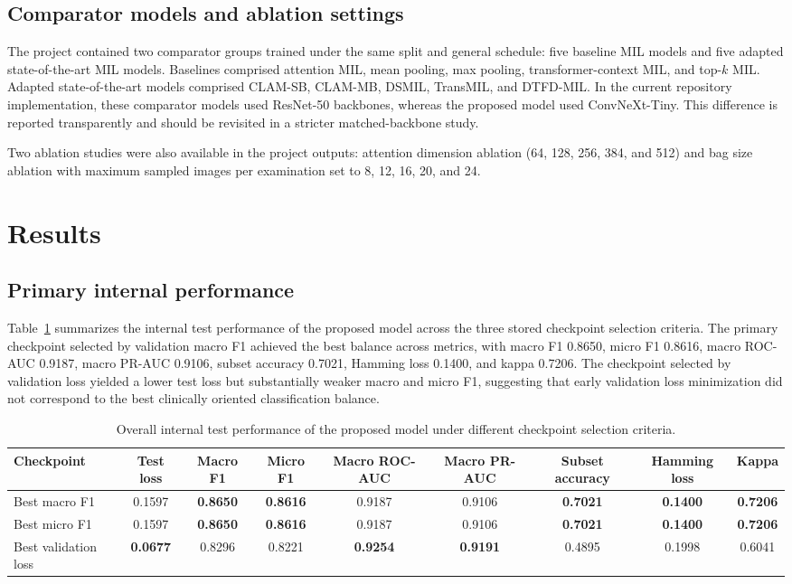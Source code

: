 \documentclass[Afour,sagev,times]{sagej}
\begin{document}
\subsection{Comparator models and ablation settings}
The project contained two comparator groups trained under the same split and general schedule: five baseline MIL models and five adapted state-of-the-art MIL models. Baselines comprised attention MIL, mean pooling, max pooling, transformer-context MIL, and top-$k$ MIL. Adapted state-of-the-art models comprised CLAM-SB, CLAM-MB, DSMIL, TransMIL, and DTFD-MIL.\cite{R5,R6,R7,R8} In the current repository implementation, these comparator models used ResNet-50 backbones, whereas the proposed model used ConvNeXt-Tiny. This difference is reported transparently and should be revisited in a stricter matched-backbone study.

Two ablation studies were also available in the project outputs: attention dimension ablation (64, 128, 256, 384, and 512) and bag size ablation with maximum sampled images per examination set to 8, 12, 16, 20, and 24.

\section{Results}
\subsection{Primary internal performance}
Table~\ref{T2} summarizes the internal test performance of the proposed model across the three stored checkpoint selection criteria. The primary checkpoint selected by validation macro F1 achieved the best balance across metrics, with macro F1 0.8650, micro F1 0.8616, macro ROC-AUC 0.9187, macro PR-AUC 0.9106, subset accuracy 0.7021, Hamming loss 0.1400, and kappa 0.7206. The checkpoint selected by validation loss yielded a lower test loss but substantially weaker macro and micro F1, suggesting that early validation loss minimization did not correspond to the best clinically oriented classification balance.

\begin{table}[h]
\small\sf\centering
\caption{Overall internal test performance of the proposed model under different checkpoint selection criteria.\label{T2}}
\begin{tabular}{lcccccccc}
\toprule
Checkpoint & Test loss & Macro F1 & Micro F1 & Macro ROC-AUC & Macro PR-AUC & Subset accuracy & Hamming loss & Kappa \\
\midrule
Best macro F1 & 0.1597 & \textbf{0.8650} & \textbf{0.8616} & 0.9187 & 0.9106 & \textbf{0.7021} & \textbf{0.1400} & \textbf{0.7206} \\
Best micro F1 & 0.1597 & \textbf{0.8650} & \textbf{0.8616} & 0.9187 & 0.9106 & \textbf{0.7021} & \textbf{0.1400} & \textbf{0.7206} \\
Best validation loss & \textbf{0.0677} & 0.8296 & 0.8221 & \textbf{0.9254} & \textbf{0.9191} & 0.4895 & 0.1998 & 0.6041 \\
\bottomrule
\end{tabular}
\end{table}
\end{document}
